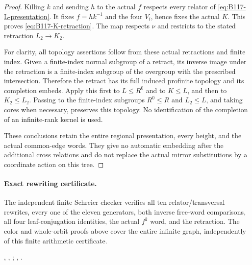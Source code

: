 \begin{proof}
Killing $k$ and sending $h$ to the actual $f$ respects every
relator of \eqref{eq:B117-L-presentation}. It fixes
$f=hk^{-1}$ and the four $V_i$, hence fixes the actual $K$.
This proves \eqref{eq:B117-K-retraction}. The map respects $\nu$
and restricts to the stated retraction $L_2\to K_2$.

For clarity, all topology assertions follow from these actual
retractions and finite index. Given a finite-index normal subgroup
of a retract, its inverse image under the retraction is a finite-index
subgroup of the overgroup with the prescribed intersection.
Therefore the retract has its full induced profinite topology and
its completion embeds. Apply this first to $L\leq R^0$ and to
$K\leq L$, and then to $K_2\leq L_2$. Passing to the finite-index
subgroups $R^0\leq R$ and $L_2\leq L$, and taking cores when
necessary, preserves this topology. No identification of the
completion of an infinite-rank kernel is used.

These conclusions retain the entire regional presentation, every
height, and the actual common-edge words. They give no automatic
embedding after the additional cross relations and do not replace
the actual mirror substitutions by a coordinate action on this tree.
\end{proof}

\paragraph{Exact rewriting certificate.}
The independent finite Schreier checker verifies all ten
relator/transversal rewrites, every one of the eleven generators,
both inverse free-word comparisons, all four leaf-conjugation
identities, the actual $f^2$ word, and the retraction. The color and
whole-orbit proofs above cover the entire infinite graph, independently
of this finite arithmetic certificate.
\begingroup\raggedright
{},
,
;
,
.
\par\endgroup
